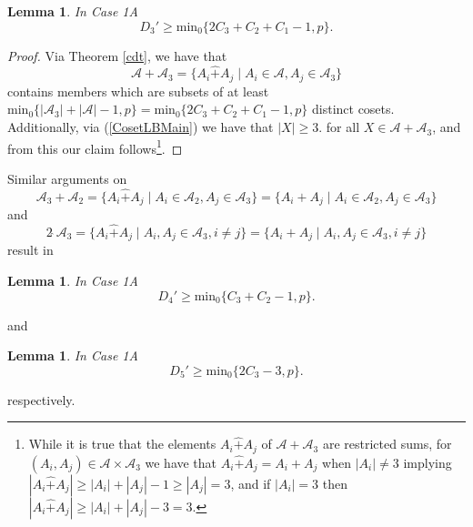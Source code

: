 \documentclass[a4paper, 12pt]{article}\usepackage[english]{babel}
\newtheorem{lem}[thm]{Lemma}
\newcommand{\minz}{\mathrm{min}_0}
\newcommand{\A}{\mathcal{A}}
\newcommand{\<}{\langle}
\begin{document}


\begin{lem}\label{Case1A:D3LB}
  In Case 1A \[D_3'\geq \minz\{2C_3+C_2+C_1-1,p\}.\] 
\end{lem}
\begin{proof}
    Via Theorem \ref{cdt}, we have that \[\A+\A_3=\{A_i\hat{+}A_j\mid A_i\in \A, A_j\in \A_3\}\] contains members which are subsets of at least $\minz\{|\A_3|+|\A|-1 ,p\}=\minz\{2C_3+C_2+C_1-1,p\}$ distinct cosets. Additionally, via (\ref{CosetLBMain}) we have that $|X|\geq 3$.  for all $X\in \A+\A_3$, and from this our claim follows\footnote{While it is true that the elements $A_i\hat{+}A_j$ of $\A+\A_3$ are restricted sums, for $(A_i,A_j)\in \A\times \A_3$ we have that $A_i\hat{+}A_j=A_i+A_j$ when $|A_i|\neq 3$ implying $|A_i\hat{+}A_j|\geq |A_i|+|A_j|-1\geq |A_j|=3$, and if $|A_i|=3$ then $|A_i\hat{+}A_j|\geq |A_i|+|A_j|-3=3$.}.
\end{proof}
Similar arguments on \[\A_3+\A_2=\{A_i\hat{+}A_j\mid A_i\in \A_2, A_j\in \A_3\}=\{A_i+A_j\mid A_i\in \A_2, A_j\in \A_3\}\] and \[2\hat{\;}\A_3=\{A_i\hat{+}A_j\mid A_i,A_j\in \A_3, i\neq j\}=\{A_i+A_j\mid A_i,A_j\in \A_3, i\neq j\}\] result in
\begin{lem}\label{Case1A:D4LB}
    In Case 1A
    \[D_4'\geq \minz\{C_3+C_2-1,p\}.\]
\end{lem}
and
\begin{lem}\label{Case1A:D5LB}
    In Case 1A
    \[D_5'\geq \minz\{2C_3-3,p\}.\]
\end{lem}
respectively.
\end{document}
